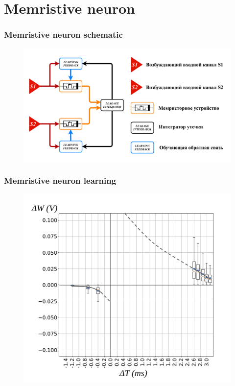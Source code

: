 \documentclass[12pt, aspectratio=169]{beamer}
\begin{document}
\section{Memristive neuron}
\begin{frame}
  \frametitle{Memristive neuron schematic}
  \begin{figure}
    \includegraphics[width=0.8\linewidth]{common_block_diag_of_mem_neuron}
  \end{figure}
\end{frame}
\begin{frame}
  \frametitle{Memristive neuron learning}
  \begin{figure}
    \includegraphics[width=0.8\linewidth]{111}
  \end{figure}
\end{frame}
\end{document}
